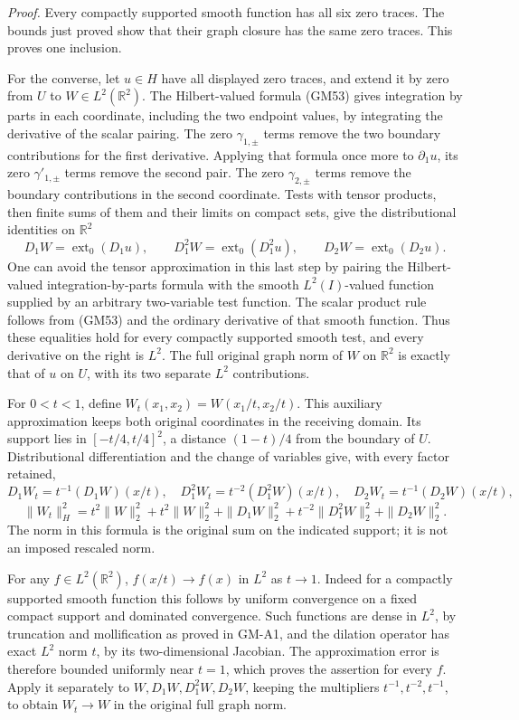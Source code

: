 \documentclass[
  11pt,
]{article}
\begin{document}
\emph{Proof.} Every compactly supported smooth function has all six zero
traces. The bounds just proved show that their graph closure has the
same zero traces. This proves one inclusion.

For the converse, let \(u\in H\) have all displayed zero
traces, and extend it by zero from \(U\) to
\(W\in L^2(\mathbb R^2)\). The Hilbert-valued formula (GM53) gives
integration by parts in each coordinate, including the two endpoint
values, by integrating the derivative of the scalar pairing. The zero
\(\gamma_{1,\pm}\) terms remove the two boundary contributions
for the first derivative. Applying that formula once more to
\(\partial_1u\), its zero \(\gamma'_{1,\pm}\) terms
remove the second pair. The zero \(\gamma_{2,\pm}\) terms remove
the boundary contributions in the second coordinate. Tests with tensor
products, then finite sums of them and their limits on compact sets,
give the distributional identities on \(\mathbb R^2\)
\[
 D_1W=\operatorname{ext}_0(D_1u),\qquad
 D_1^2W=\operatorname{ext}_0(D_1^2u),\qquad
 D_2W=\operatorname{ext}_0(D_2u).
\] One can avoid the tensor approximation in
this last step by pairing the Hilbert-valued integration-by-parts
formula with the smooth \(L^2(I)\)-valued function
supplied by an arbitrary two-variable test function. The scalar product
rule follows from (GM53) and the ordinary derivative of that smooth
function. Thus these equalities hold for every compactly supported
smooth test, and every derivative on the right is
\(L^2\). The full original graph norm of
\(W\) on \(\mathbb R^2\) is exactly that
of \(u\) on \(U\), with its
two separate \(L^2\) contributions.

For \(0<t<1\), define \(W_t(x_1,x_2)=W(x_1/t,x_2/t)\). This
auxiliary approximation keeps both original coordinates in the receiving
domain. Its support lies in \([-t/4,t/4]^2\), a distance
\((1-t)/4\) from the boundary of
\(U\). Distributional differentiation and the
change of variables give, with every factor retained,
\[
 D_1W_t=t^{-1}(D_1W)(x/t),\quad
 D_1^2W_t=t^{-2}(D_1^2W)(x/t),\quad
 D_2W_t=t^{-1}(D_2W)(x/t),
\] \[
 \|W_t\|_H^2
    =t^2\|W\|_2^2+t^2\|W\|_2^2
       +\|D_1W\|_2^2+t^{-2}\|D_1^2W\|_2^2+\|D_2W\|_2^2.
 \tag{GM57}
\] The norm in this
formula is the original sum on the indicated support; it is not an
imposed rescaled norm.

For any \(f\in L^2(\mathbb R^2)\), \(f(x/t)\to f(x)\) in
\(L^2\) as \(t\to1\). Indeed for a
compactly supported smooth function this follows by uniform convergence
on a fixed compact support and dominated convergence. Such functions are
dense in \(L^2\), by truncation and mollification as
proved in GM-A1, and the dilation operator has exact
\(L^2\) norm \(t\), by its
two-dimensional Jacobian. The approximation error is therefore bounded
uniformly near \(t=1\), which proves the assertion
for every \(f\). Apply it separately to
\(W,D_1W,D_1^2W,D_2W\), keeping the multipliers
\(t^{-1},t^{-2},t^{-1}\), to obtain \(W_t\to W\) in the
original full graph norm.
\end{document}

